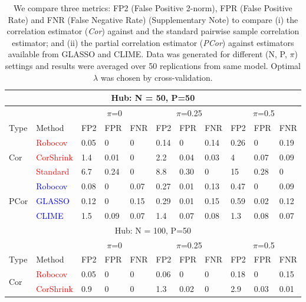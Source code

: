 \small
\begin{table}[h]
\caption{{We compare three metrics: FP2 (False Positive 2-norm), FPR (False Positive Rate) and FNR (False Negative Rate) (Supplementary Note) to compare (i) the  \Robocov{} correlation estimator (\textit{Cor}) against \CorShrink{} and the standard pairwise sample correlation estimator; and (ii) the \Robocov{} partial correlation estimator (\textit{PCor})  against estimators available from GLASSO and CLIME. Data was generated for different (N, P, $\pi$) settings and results were averaged over 50 replications from same model. Optimal $\lambda$ was chosen by cross-validation.}}
\label{tab:tab1} 
\begin{tabular}[!t]{|p{0.5cm}|p{1.1cm}|p{0.4cm}|p{0.45cm}|p{0.45cm}|p{0.4cm}|p{0.45cm}|p{0.45cm}|p{0.4cm}|p{0.45cm}|p{0.45cm}|}
\hline 
\multicolumn{11}{|c|}{Hub: N = 50, P=50} \\ \hline
& & \multicolumn{3}{c|}{$\pi$=0} & \multicolumn{3}{c|}{$\pi$=0.25} & \multicolumn{3}{c|}{$\pi$=0.5} \\ \hline
 Type & Method & FP2 & FPR & FNR &  FP2 & FPR & FNR & FP2 & FPR & FNR \\ \hline 
\multirow{ 3}{*}{Cor} & \textcolor{red}{Robocov} & 0.05 &   0 &   0  & 0.14 &   0 & 0.14 & 0.26 &   0 & 0.19 \\
& \textcolor{red}{CorShrink} & 1.4 & 0.01 &  0 & 2.2 & 0.04 & 0.03 &  4 & 0.07 & 0.09 \\
& \textcolor{red}{Standard} & 6.7 & 0.24 &  0  & 8.8 & 0.30 &  0 &  15 & 0.28 & 0 \\  \hline 
\multirow{ 3}{*}{PCor} & \textcolor{blue}{Robocov} & 0.08 & 0 & 0.07 & 0.27 & 0.01 & 0.13 & 0.47 & 0 & 0.09 \\
& \textcolor{blue}{GLASSO} & 0.12 & 0 & 0.15 & 0.29 & 0.01 & 0.15 & 0.59 & 0.02 & 0.12 \\
& \textcolor{blue}{CLIME} & 1.5 & 0.09 & 0.07 & 1.4 & 0.07 & 0.08 & 1.3 & 0.08 & 0.07 \\ \hline 
\multicolumn{11}{|c|}{Hub: N = 100, P=50} \\ \hline
& & \multicolumn{3}{c|}{$\pi$=0} & \multicolumn{3}{c|}{$\pi$=0.25} & \multicolumn{3}{c|}{$\pi$=0.5} \\ \hline
Type & Method & FP2 & FPR & FNR &  FP2 & FPR & FNR & FP2 & FPR & FNR \\ \hline
\multirow{ 3}{*}{Cor} & \textcolor{red}{Robocov} & 0.05 &   0 &   0 & 0.06 &   0 &   0 & 0.18 &   0 & 0.15\\
& \textcolor{red}{CorShrink} & 0.9 &   0 &   0 & 1.3 & 0.02 &   0 & 2.9 & 0.03 & 0.01 \\

\end{tabular}
\end{table}
